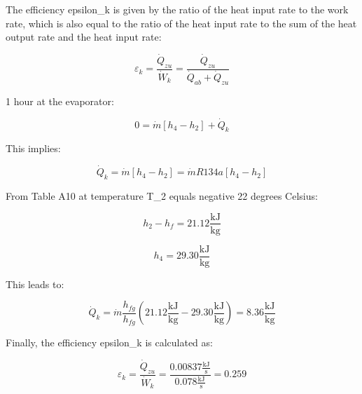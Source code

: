 The efficiency epsilon_k is given by the ratio of the heat input rate to the work rate, which is also equal to the ratio of the heat input rate to the sum of the heat output rate and the heat input rate:

\[
\varepsilon_k = \frac{\dot{Q}_{zu}}{\dot{W}_k} = \frac{\dot{Q}_{zu}}{\dot{Q}_{ab} + \dot{Q}_{zu}}
\]

1 hour at the evaporator:

\[
0 = \dot{m} \left[ h_4 - h_2 \right] + \dot{Q}_k
\]

This implies:

\[
\dot{Q}_k = \dot{m} \left[ h_4 - h_2 \right] = \dot{m} R134a \left[ h_4 - h_2 \right]
\]

From Table A10 at temperature T_2 equals negative 22 degrees Celsius:

\[
h_2 - h_f = 21.12 \frac{\text{kJ}}{\text{kg}}
\]

\[
h_4 = 29.30 \frac{\text{kJ}}{\text{kg}}
\]

This leads to:

\[
\dot{Q}_k = \dot{m} \frac{h_{fg}}{h_{fg}} \left( 21.12 \frac{\text{kJ}}{\text{kg}} - 29.30 \frac{\text{kJ}}{\text{kg}} \right) = 8.36 \frac{\text{kJ}}{\text{kg}}
\]

Finally, the efficiency epsilon_k is calculated as:

\[
\varepsilon_k = \frac{\dot{Q}_{zu}}{\dot{W}_k} = \frac{0.00837 \frac{\text{kJ}}{\text{s}}}{0.078 \frac{\text{kJ}}{\text{s}}} = 0.259
\]